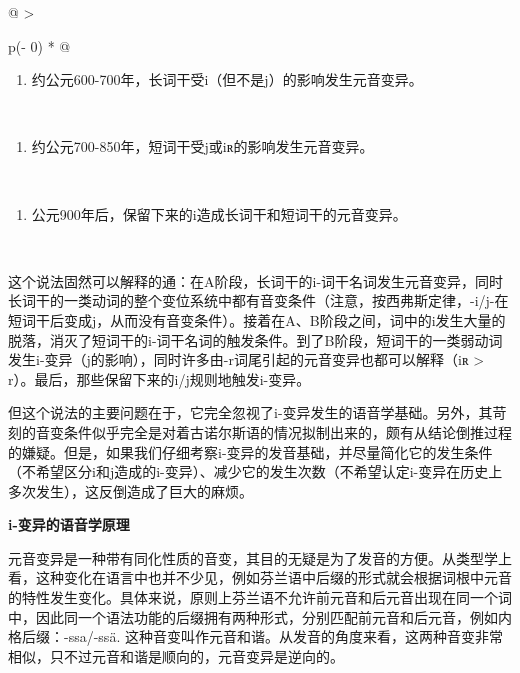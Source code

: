 \begin{longtable}[]{@{}
  >{\raggedright\arraybackslash}p{(\columnwidth - 0\tabcolsep) * }@{}}
\toprule\noalign{}
\begin{minipage}[b]{\linewidth}\raggedright
\begin{enumerate}
\def\labelenumi{\Alph{enumi}.}
\item
  约公元600-700年，长词干受i（但不是j）的影响发生元音变异。
\end{enumerate}
\end{minipage} \\
\midrule\noalign{}
\endhead
\bottomrule\noalign{}
\endlastfoot
\begin{minipage}[t]{\linewidth}\raggedright
\begin{enumerate}
\def\labelenumi{\Alph{enumi}.}
\setcounter{enumi}{1}
\item
  约公元700-850年，短词干受j或iʀ的影响发生元音变异。
\end{enumerate}
\end{minipage} \\
\begin{minipage}[t]{\linewidth}\raggedright
\begin{enumerate}
\def\labelenumi{\Alph{enumi}.}
\setcounter{enumi}{2}
\item
  公元900年后，保留下来的i造成长词干和短词干的元音变异。
\end{enumerate}
\end{minipage} \\
\end{longtable}

这个说法固然可以解释的通：在A阶段，长词干的i-词干名词发生元音变异，同时长词干的一类动词的整个变位系统中都有音变条件（注意，按西弗斯定律，-i/j-在短词干后变成j，从而没有音变条件）。接着在A、B阶段之间，词中的i发生大量的脱落，消灭了短词干的i-词干名词的触发条件。到了B阶段，短词干的一类弱动词发生i-变异（j的影响），同时许多由-r词尾引起的元音变异也都可以解释（iʀ
\textgreater{} r）。最后，那些保留下来的i/j规则地触发i-变异。

但这个说法的主要问题在于，它完全忽视了i-变异发生的语音学基础。另外，其苛刻的音变条件似乎完全是对着古诺尔斯语的情况拟制出来的，颇有从结论倒推过程的嫌疑。但是，如果我们仔细考察i-变异的发音基础，并尽量简化它的发生条件（不希望区分i和j造成的i-变异）、减少它的发生次数（不希望认定i-变异在历史上多次发生），这反倒造成了巨大的麻烦。

\textbf{i-变异的语音学原理}

元音变异是一种带有同化性质的音变，其目的无疑是为了发音的方便。从类型学上看，这种变化在语言中也并不少见，例如芬兰语中后缀的形式就会根据词根中元音的特性发生变化。具体来说，原则上芬兰语不允许前元音和后元音出现在同一个词中，因此同一个语法功能的后缀拥有两种形式，分别匹配前元音和后元音，例如内格后缀：-ssa/-ssä.
这种音变叫作元音和谐。从发音的角度来看，这两种音变非常相似，只不过元音和谐是顺向的，元音变异是逆向的。


